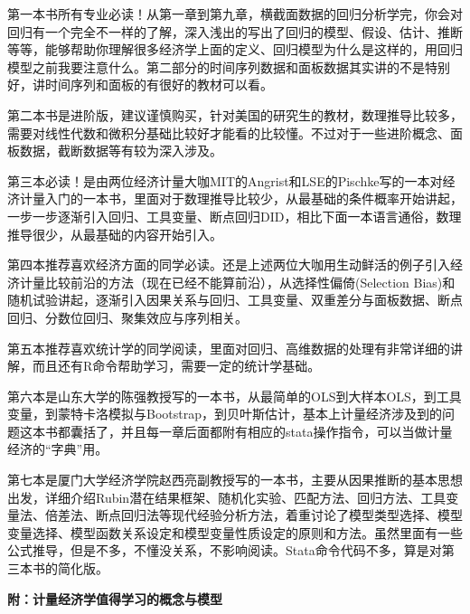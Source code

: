 \documentclass[11pt, a4paper]{article}
\begin{document}
第一本书所有专业必读！从第一章到第九章，横截面数据的回归分析学完，你会对回归有一个完全不一样的了解，深入浅出的写出了回归的模型、假设、估计、推断等等，能够帮助你理解很多经济学上面的定义、回归模型为什么是这样的，用回归模型之前我要注意什么。第二部分的时间序列数据和面板数据其实讲的不是特别好，讲时间序列和面板的有很好的教材可以看。

第二本书是进阶版，建议谨慎购买，针对美国的研究生的教材，数理推导比较多，需要对线性代数和微积分基础比较好才能看的比较懂。不过对于一些进阶概念、面板数据，截断数据等有较为深入涉及。

第三本必读！是由两位经济计量大咖MIT的Angrist和LSE的Pischke写的一本对经济计量入门的一本书，里面对于数理推导比较少，从最基础的条件概率开始讲起，一步一步逐渐引入回归、工具变量、断点回归DID，相比下面一本语言通俗，数理推导很少，从最基础的内容开始引入。

第四本推荐喜欢经济方面的同学必读。还是上述两位大咖用生动鲜活的例子引入经济计量比较前沿的方法（现在已经不能算前沿），从选择性偏倚(Selection Bias)和随机试验讲起，逐渐引入因果关系与回归、工具变量、双重差分与面板数据、断点回归、分数位回归、聚集效应与序列相关。

第五本推荐喜欢统计学的同学阅读，里面对回归、高维数据的处理有非常详细的讲解，而且还有R命令帮助学习，需要一定的统计学基础。

第六本是山东大学的陈强教授写的一本书，从最简单的OLS到大样本OLS，到工具变量，到蒙特卡洛模拟与Bootstrap，到贝叶斯估计，基本上计量经济涉及到的问题这本书都囊括了，并且每一章后面都附有相应的stata操作指令，可以当做计量经济的“字典”用。

第七本是厦门大学经济学院赵西亮副教授写的一本书，主要从因果推断的基本思想出发，详细介绍Rubin潜在结果框架、随机化实验、匹配方法、回归方法、工具变量法、倍差法、断点回归法等现代经验分析方法，着重讨论了模型类型选择、模型变量选择、模型函数关系设定和模型变量性质设定的原则和方法。虽然里面有一些公式推导，但是不多，不懂没关系，不影响阅读。Stata命令代码不多，算是对第三本书的简化版。



\textbf{附：计量经济学值得学习的概念与模型}
\end{document}
